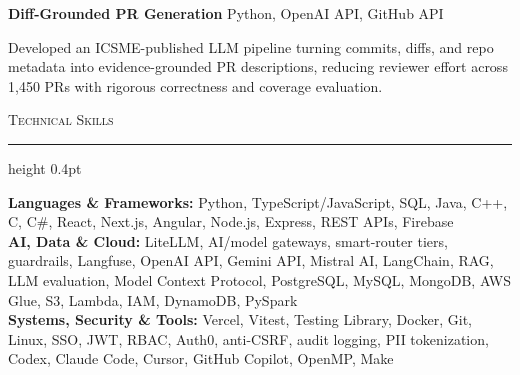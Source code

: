 \documentclass[letterpaper,11pt]{article}
\newcommand{\resumesection}[1]{%
  \par\vspace{2pt}%
  {\large\scshape #1}\par\vspace{2pt}%
  \hrule height 0.4pt\vspace{2pt}%
}
\newcommand{\projectHeading}[2]{
  \textbf{#1} \hfill #2
}
\begin{document}
\projectHeading{Diff-Grounded PR Generation}{Python, OpenAI API, GitHub API}
\begin{tightitemize}
  \item Developed an ICSME-published LLM pipeline turning commits, diffs, and repo metadata into evidence-grounded PR descriptions, reducing reviewer effort across 1,450 PRs with rigorous correctness and coverage evaluation.
\end{tightitemize}

\resumesection{Technical Skills}
\textbf{Languages \& Frameworks:} Python, TypeScript/JavaScript, SQL, Java, C++, C, C\#, React, Next.js, Angular, Node.js, Express, REST APIs, Firebase\\
\textbf{AI, Data \& Cloud:} LiteLLM, AI/model gateways, smart-router tiers, guardrails, Langfuse, OpenAI API, Gemini API, Mistral AI, LangChain, RAG, LLM evaluation, Model Context Protocol, PostgreSQL, MySQL, MongoDB, AWS Glue, S3, Lambda, IAM, DynamoDB, PySpark\\
\textbf{Systems, Security \& Tools:} Vercel, Vitest, Testing Library, Docker, Git, Linux, SSO, JWT, RBAC, Auth0, anti-CSRF, audit logging, PII tokenization, Codex, Claude Code, Cursor, GitHub Copilot, OpenMP, Make
\end{document}

